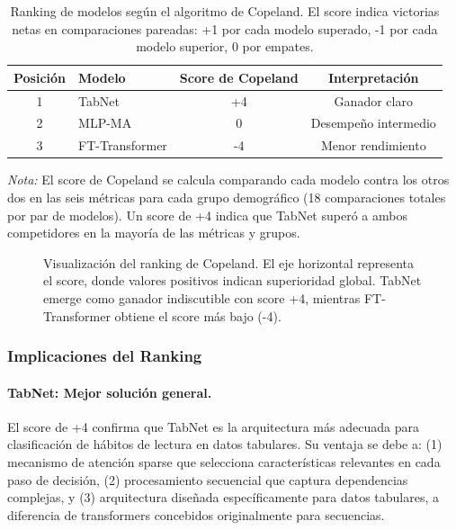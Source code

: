 \documentclass[12pt,a4paper]{article}
\begin{document}
\begin{table}[H]
\centering
\caption{Ranking de modelos según el algoritmo de Copeland. El score indica victorias netas en comparaciones pareadas: +1 por cada modelo superado, -1 por cada modelo superior, 0 por empates.}
\label{tab:copeland_ranking}
\begin{tabular}{clcc}
\toprule
\textbf{Posición} & \textbf{Modelo} & \textbf{Score de Copeland} & \textbf{Interpretación} \\
\midrule
1 & TabNet & +4 & Ganador claro \\
2 & MLP-MA & \phantom{+}0 & Desempeño intermedio \\
3 & FT-Transformer & -4 & Menor rendimiento \\
\bottomrule
\end{tabular}
\begin{flushleft}
\small
\textit{Nota:} El score de Copeland se calcula comparando cada modelo contra los otros dos en las seis métricas para cada grupo demográfico (18 comparaciones totales por par de modelos). Un score de +4 indica que TabNet superó a ambos competidores en la mayoría de las métricas y grupos.
\end{flushleft}
\end{table}

\begin{figure}[H]
\centering
{}
\caption{Visualización del ranking de Copeland. El eje horizontal representa el score, donde valores positivos indican superioridad global. TabNet emerge como ganador indiscutible con score +4, mientras FT-Transformer obtiene el score más bajo (-4).}
\label{fig:copeland_ranking}
\end{figure}

\subsubsection{Implicaciones del Ranking}

\paragraph{TabNet: Mejor solución general.} El score de +4 confirma que TabNet es la arquitectura más adecuada para clasificación de hábitos de lectura en datos tabulares. Su ventaja se debe a: (1) mecanismo de atención sparse que selecciona características relevantes en cada paso de decisión, (2) procesamiento secuencial que captura dependencias complejas, y (3) arquitectura diseñada específicamente para datos tabulares, a diferencia de transformers concebidos originalmente para secuencias.
\end{document}
